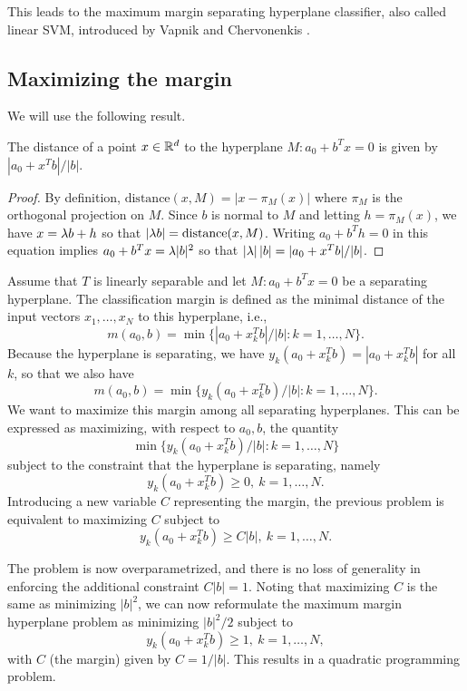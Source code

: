 This leads to the maximum margin separating
hyperplane classifier, also called linear SVM, introduced by
Vapnik and Chervonenkis \cite{vapnik1998statistical,vapnik2013nature}.


\subsection{Maximizing the margin}
We will use the following result.
\begin{proposition}
\label{prop:dist.hyp}
The distance of a point $x\in{\mathbb{R}}^d$ to the hyperplane $M: {a_0} + b^Tx = 0$ is given by $|{a_0} + x^Tb|/|b|$.
\end{proposition}
\begin{proof}
By definition, $\mathrm{distance}(x, M) = |x - \pi_M(x)|$ where $\pi_M$ is the orthogonal projection on $M$. 
Since $b$ is normal to $M$ and letting $h = \pi_M(x)$, we have $x = \lambda b + h$ so that  $|\lambda b| = \mathrm{distance}(x, M)$.
 Writing ${a_0} + b^T h = 0$ in this equation implies ${a_0} + b^T x = \lambda|b|^2$ so that $|\lambda|\, |b| = |{a_0} + x^Tb|/|b|$.
\end{proof}

 Assume that $T$ is linearly separable and let $M: {a_0} + b^Tx = 0$ be a separating hyperplane.
 The classification margin is defined as the minimal distance of the input vectors $x_1, \ldots, x_N$ to this hyperplane, i.e., 
\[
m({a_0}, b) = \min\{ |{a_0} + x_k^T b|/|b|: k=1, \ldots, N\}.
\]
 Because the hyperplane is separating, we have $y_k({a_0} + x_k^T b) = |{a_0} + x_k^T b|$ for all $k$, so that we also have
\[
m({a_0}, b) = \min\{ y_k({a_0} + x_k^T b)/|b|: k=1, \ldots, N\}.
\]
 We want to maximize this margin among all separating hyperplanes. This can be expressed as  maximizing, with respect to ${a_0}, b$, the quantity
\[
\min\{ y_k({a_0} + x_k^T b)/|b|: k=1, \ldots, N\}
\]
subject to the constraint that the hyperplane is separating, namely
\[
y_k({a_0} + x_k^T b) \geq 0,\ k=1, \ldots, N.
\]
Introducing a new variable $C$ representing the margin,  the previous problem is equivalent to maximizing $C$ subject to
\[
y_k({a_0} + x_k^T b) \geq C|b|,\ k=1, \ldots, N.
\]

The problem is now overparametrized, and there is no loss of generality in enforcing the additional constraint $C |b| = 1$. Noting that maximizing $C$ is the same as minimizing $|b|^2$, we can now reformulate the maximum margin hyperplane problem as minimizing $|b|^2/2$ subject to
\[
y_k({a_0} + x_k^T b) \geq 1,\ k=1, \ldots, N,
\]
with $C$ (the margin) given by $C = 1/|b|$.
 This results in a quadratic programming problem.

